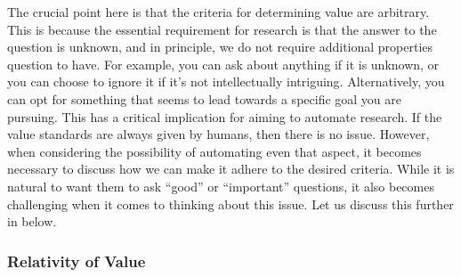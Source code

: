 \documentclass{book}
\begin{document}
The crucial point here is that the criteria for determining value are arbitrary. This is because the essential requirement for research is that the answer to the question is unknown, and in principle, we do not require additional properties question to have. For example, you can ask about anything if it is unknown, or you can choose to ignore it if it's not intellectually intriguing. Alternatively, you can opt for something that seems to lead towards a specific goal you are pursuing. This has a critical implication for aiming to automate research. If the value standards are always given by humans, then there is no issue. However, when considering the possibility of automating even that aspect, it becomes necessary to discuss how we can make it adhere to the desired criteria. While it is natural to want them to ask ``good'' or ``important'' questions, it also becomes challenging when it comes to thinking about this issue. Let us discuss this further in below.

\subsubsection{Relativity of Value}
\end{document}
